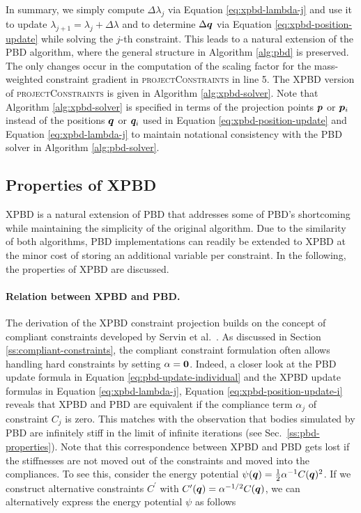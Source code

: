 In summary, we simply compute $\Delta \lambda_j$ via Equation \ref{eq:xpbd-lambda-j} and use it to 
update $\lambda_{j+1} = \lambda_j + \Delta \lambda$ and to determine $\Delta \bm{q}$ via Equation \ref{eq:xpbd-position-update} while solving the $j$-th constraint. 
This leads to a natural extension of the PBD algorithm, where the general structure in Algorithm \ref{alg:pbd} is preserved. The only changes occur in the 
computation of the scaling factor for the 
mass-weighted constraint gradient in \textsc{projectConstraints} in line 5. The XPBD version of \textsc{projectConstraints} is given in 
Algorithm \ref{alg:xpbd-solver}. Note that Algorithm \ref{alg:xpbd-solver} is specified in terms of the projection points $\bm{p}$ or $\bm{p}_i$ instead of the 
positions $\bm{q}$ or $\bm{q}_i$ used in Equation \ref{eq:xpbd-position-update} and Equation \ref{eq:xpbd-lambda-j} to maintain notational consistency with the
PBD solver in Algorithm \ref{alg:pbd-solver}.


\subsection{Properties of XPBD}\label{ss:xpbd-properties}
XPBD is a natural extension of PBD that addresses some of PBD's shortcoming while maintaining the simplicity of the original algorithm. Due to
the similarity of both algorithms, PBD implementations can readily be extended to XPBD at the minor cost of storing an additional variable per 
constraint. In the following, the properties of XPBD are discussed.

\paragraph{Relation between XPBD and PBD.}
The derivation of the XPBD constraint projection builds on the concept of compliant constraints developed by Servin et al.\ 
\cite{servin2006}. As discussed in Section \ref{ss:compliant-constraints}, the compliant constraint formulation often allows handling hard constraints by
setting $\mathbf{\alpha} = \mathbf{0}$. Indeed, a closer look at the PBD update formula in Equation \ref{eq:pbd-update-individual} and the XPBD update 
formulas in Equation \ref{eq:xpbd-lambda-j}, Equation \ref{eq:xpbd-position-update-i} reveals that XPBD and 
PBD are equivalent if the compliance term $\alpha_j$ of constraint $C_j$ is zero. This matches with the observation that bodies 
simulated by PBD are infinitely stiff in the limit of infinite iterations (see Sec.\ \ref{ss:pbd-properties}). Note that this correspondence between XPBD 
and PBD gets lost if the stiffnesses are not moved out of the constraints and moved into the compliances. To see this, consider the energy 
potential $\psi(\bm{q}) = \frac{1}{2} \alpha^{-1} C(\bm{q})^2$. If we construct alternative constraints $C^\prime$ with $C^\prime(\bm{q}) = 
\alpha^{-1/2}C(\bm{q})$, we can alternatively express the energy potential $\psi$ as follows

